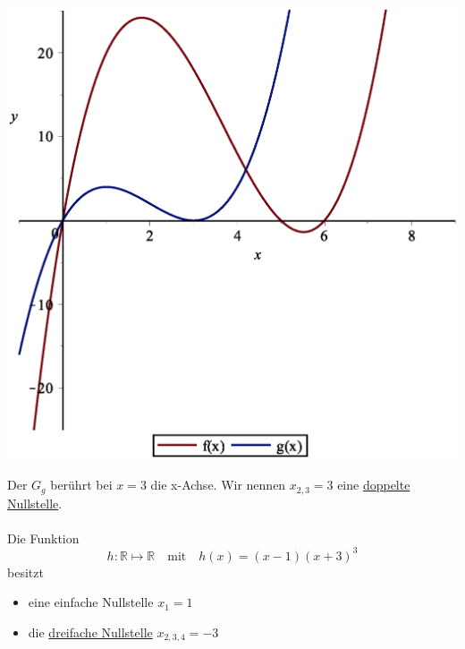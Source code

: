 \documentclass{report}
\begin{document}
\begin{center}
\includegraphics[scale=0.3]{images/ganzrationale_funkt_1.eps}
\end{center}
Der $G_g$ berührt bei $x=3$ die x-Achse. Wir nennen $x_{2,3}=3$ eine \underline{doppelte Nullstelle}.\\\\
Die Funktion
\begin{equation}h : \mathbb{R} \mapsto \mathbb{R} \quad \mbox{mit} \quad h(x) = (x-1)(x+3)^3\end{equation}
besitzt
\begin{itemize}
\item eine einfache Nullstelle $x_1 = 1$
\item die \underline{dreifache Nullstelle} $x_{2,3,4} = -3$\end{itemize}
\end{document}
